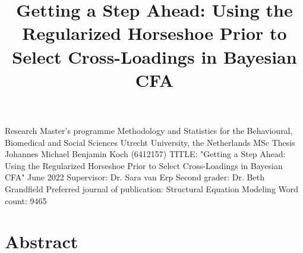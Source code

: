 \documentclass[
  english,
  man, donotrepeattitle,floatsintext]{apa6}
\title{Getting a Step Ahead: Using the Regularized Horseshoe Prior to Select Cross-Loadings in Bayesian CFA}
\author{\phantom{0}}
\date{}
\affiliation{\phantom{0}}
\begin{document}
\maketitle

\thispagestyle{empty}

\begin{large}
\noindent Research Master's programme 
Methodology and Statistics for the Behavioural, Biomedical and Social Sciences \newline
Utrecht University, the Netherlands \newline
\newline
\newline
\newline
\newline
MSc Thesis Johannes Michael Benjamin Koch (6412157) 
\newline
TITLE: "Getting a Step Ahead: Using the Regularized Horseshoe Prior to Select Cross-Loadings in Bayesian CFA"
\newline
June 2022 
\newline
\newline
\newline
\newline
\newline
Supervisor:\newline
Dr. Sara van Erp \newline
\newline
\newline
Second grader: \newline
Dr. Beth Grandfield
\newline
\newline
\newline
\newline
Preferred journal of publication: Structural Equation Modeling
\newline
Word count: 9465
\newline
\end{large}
\addtocounter{page}{-1}
\clearpage
\pagebreak

\pagestyle{plain}

\clearpage

\hypertarget{abstract}{%
\section{Abstract}\label{abstract}}
\end{document}
